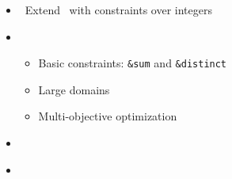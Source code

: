 \begin{frame}{\clingcon}
  \begin{itemize}
  \item {} \ Extend \clingo\ with constraints over integers
  \item {} \
    \begin{itemize}
    \item Basic constraints: \lstinline{&sum} and \lstinline{&distinct}
    \item Large domains
    \item Multi-objective optimization
    \end{itemize}
  \item {} \ \cite{bakaossc16a}
  \item {} \ \cite{?}
  \end{itemize}
\end{frame}
%
